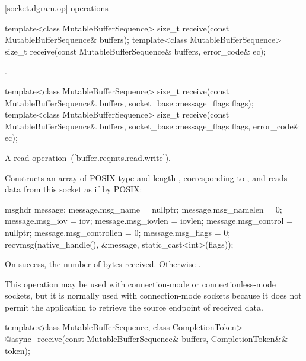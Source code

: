 [socket.dgram.op]{ operations}

\begin{itemdecl}
template<class MutableBufferSequence>
  size_t receive(const MutableBufferSequence& buffers);
template<class MutableBufferSequence>
  size_t receive(const MutableBufferSequence& buffers,
                 error_code& ec);
\end{itemdecl}

\begin{itemdescr}
\pnum
\returns {}.
\end{itemdescr}

\begin{itemdecl}
template<class MutableBufferSequence>
  size_t receive(const MutableBufferSequence& buffers,
                 socket_base::message_flags flags);
template<class MutableBufferSequence>
  size_t receive(const MutableBufferSequence& buffers,
                 socket_base::message_flags flags, error_code& ec);
\end{itemdecl}

\begin{itemdescr}
\pnum
A read operation~(\ref{buffer.reqmts.read.write}).

\pnum
\effects Constructs an array  of POSIX type  and length , corresponding to , and reads data from this socket as if by POSIX: 
\begin{codeblock}
msghdr message;
message.msg_name = nullptr;
message.msg_namelen = 0;
message.msg_iov = iov;
message.msg_iovlen = iovlen;
message.msg_control = nullptr;
message.msg_controllen = 0;
message.msg_flags = 0;
recvmsg(native_handle(), &message, static_cast<int>(flags));
\end{codeblock}


\pnum
\returns On success, the number of bytes received. Otherwise .

\pnum
 \enternote This operation may be used with connection-mode or connectionless-mode sockets, but it is normally used with connection-mode sockets because it does not permit the application to retrieve the source endpoint of received data. \exitnote
\end{itemdescr}

\begin{itemdecl}
template<class MutableBufferSequence, class CompletionToken>
  @\DEDUCED@ async_receive(const MutableBufferSequence& buffers,
                        CompletionToken&& token);
\end{itemdecl}

